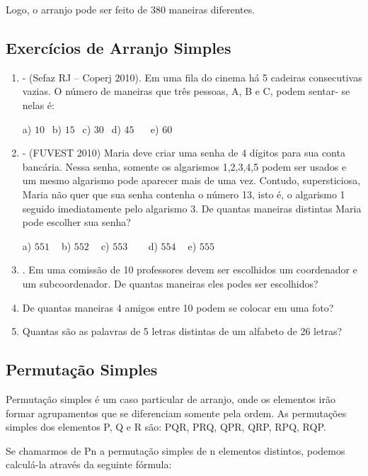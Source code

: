 \begin{multicols*}{2}
Logo, o arranjo pode ser feito de 380 maneiras diferentes.

\subsection{Exercícios de Arranjo Simples}

			\begin{enumerate}

			\item - (Sefaz RJ – Coperj 2010). Em uma fila do cinema há 5 cadeiras consecutivas
vazias. O número de maneiras que três pessoas, A, B e C, podem sentar- se nelas é:

		a) $10 \ \ $ b) $15 \ \ $ c) $30 \ \ $ d) $45 \ \ \ \ \ \ $ e) $60 \ \ $

			\item - (FUVEST 2010) Maria deve criar uma senha de 4 dígitos para sua conta bancária.
Nessa senha, somente os algarismos 1,2,3,4,5 podem ser usados e um mesmo algarismo pode
aparecer mais de uma vez. Contudo, supersticiosa, Maria não quer que sua senha contenha o
número 13, isto é, o algarismo 1 seguido imediatamente pelo algarismo 3. De quantas maneiras
distintas Maria pode escolher sua senha?

		a) $551 \ \ \ \ $ b) $552 \ \ \ \ $ c) $553 \ \ \ \ \ \ \ \ $ d) $554 \ \ \ \ $ e) $555 \ \ $

			\item . Em uma comissão de 10 professores devem ser escolhidos um coordenador e um subcoordenador. De quantas maneiras eles podes ser escolhidos?
			
			\item De quantas maneiras 4 amigos entre 10 podem se colocar em uma foto?
			
			\item Quantas são as palavras de 5 letras distintas de um alfabeto de 26 letras?
			
			\end{enumerate}

\subsection{Permutação Simples}

Permutação simples é um caso particular de arranjo, onde os elementos irão formar agrupamentos que se diferenciam somente pela ordem. As permutações simples dos elementos P, Q e R são: PQR, PRQ, QPR, QRP, RPQ, RQP.

Se chamarmos de Pn a permutação simples de n elementos distintos, podemos calculá-la através da seguinte fórmula:


\end{multicols*}
